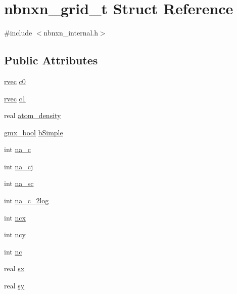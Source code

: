 \hypertarget{structnbnxn__grid__t}{\section{nbnxn\-\_\-grid\-\_\-t \-Struct \-Reference}
\label{structnbnxn__grid__t}
}


{\ttfamily \#include $<$nbnxn\-\_\-internal.\-h$>$}

\subsection*{\-Public \-Attributes}
\begin{DoxyCompactItemize}
\item 
\hyperlink{share_2template_2gromacs_2types_2simple_8h_aa02a552a4abd2f180c282a083dc3a999}{rvec} \hyperlink{structnbnxn__grid__t_a3bea9dfb807a7abd942c0b960f73e0f0}{c0}
\item 
\hyperlink{share_2template_2gromacs_2types_2simple_8h_aa02a552a4abd2f180c282a083dc3a999}{rvec} \hyperlink{structnbnxn__grid__t_a8706efbc027f39240acb0702d3defce1}{c1}
\item 
real \hyperlink{structnbnxn__grid__t_a5b70775b3771d908938bb2cebae754f9}{atom\-\_\-density}
\item 
\hyperlink{include_2types_2simple_8h_a8fddad319f226e856400d190198d5151}{gmx\-\_\-bool} \hyperlink{structnbnxn__grid__t_a1455023df05b0d3a7d47f77d2659f75e}{b\-Simple}
\item 
int \hyperlink{structnbnxn__grid__t_a4592a1f1aa3be92c846d558881cdfbe0}{na\-\_\-c}
\item 
int \hyperlink{structnbnxn__grid__t_aae37ad543cc9c99da22dbfae1714c684}{na\-\_\-cj}
\item 
int \hyperlink{structnbnxn__grid__t_a7a1a690d8ac2a76ebf050d1a9245dcd2}{na\-\_\-sc}
\item 
int \hyperlink{structnbnxn__grid__t_a2536b646af1a20ee6d2aa79b858bb6d7}{na\-\_\-c\-\_\-2log}
\item 
int \hyperlink{structnbnxn__grid__t_a00c0e597abc18cd639f7b6da0d11e811}{ncx}
\item 
int \hyperlink{structnbnxn__grid__t_a9aaa1cccebc128e4840c3ae9313677ff}{ncy}
\item 
int \hyperlink{structnbnxn__grid__t_acc31bda66f26cf8398d96f12c8766daa}{nc}
\item 
real \hyperlink{structnbnxn__grid__t_a05552a132887153ae67d8d4b09c7cb72}{sx}
\item 
real \hyperlink{structnbnxn__grid__t_a334d7bf894ffa850d2d36a573aa3f215}{sy}

\end{DoxyCompactItemize}
